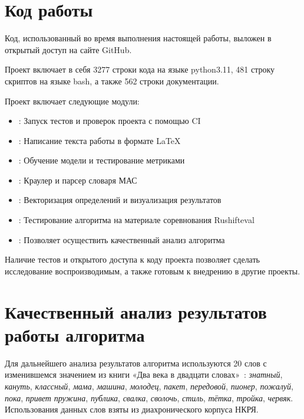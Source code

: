 \documentclass[LI,VKR]{HSEUniversity}
\begin{document}
\section{Код работы}

Код, использованный во время выполнения настоящей работы, выложен в открытый доступ
на сайте GitHub.~

Проект включает в себя 3277 строки кода на языке python3.11, %
481 строку скриптов на языке bash,
а также 562 строки документации. %

Проект включает следующие модули:
\begin{itemize}
    \item {}: Запуск тестов и проверок проекта с помощью CI
    \item {}: Написание текста работы в формате LaTeX
    \item {}: Обучение модели и тестирование метриками
    \item {}: Краулер и парсер словаря МАС
    \item {}: Векторизация определений и визуализация результатов
    \item {}: Тестирование алгоритма на материале соревнования Rushifteval
    \item {}: Позволяет осуществить качественный анализ алгоритма
\end{itemize}

Наличие тестов и открытого доступа к коду проекта позволяет
сделать исследование воспроизводимым, а также готовым к внедрению в другие проекты.

\section{Качественный анализ результатов работы алгоритма}

Для дальнейшего анализа результатов алгоритма используются 20 слов с изменившемся
значением из книги «Два века в двадцати словах»~\cite{TwoCenturies}:
\textit{знатный}, \textit{кануть}, \textit{классный}, \textit{мама}, \textit{машина}, \textit{молодец},
\textit{пакет}, \textit{передовой}, \textit{пионер}, \textit{пожалуй}, \textit{пока}, \textit{привет}
\textit{пружина}, \textit{публика}, \textit{свалка}, \textit{сволочь},
\textit{стиль}, \textit{тётка}, \textit{тройка}, \textit{червяк}.
Использования данных слов взяты из диахронического корпуса НКРЯ.
\end{document}
